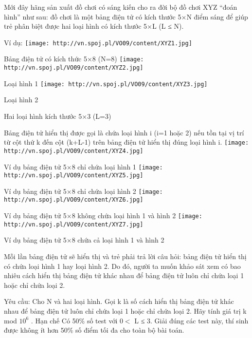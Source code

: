 Mới đây hãng sản xuất đồ chơi có sáng kiến cho ra đời bộ đồ chơi XYZ “đoán hình” như sau: đồ chơi là một bảng điện tử có kích thước 5×N điểm sáng để giúp trẻ phân biệt được hai loại hình có kích thước 5×L (L ≤ N).  

   Ví dụ:  
\texttt{[image: http://vn.spoj.pl/VO09/content/XYZ1.jpg]}

               Bảng điện tử có kích thức 5×8 (N=8)             
\texttt{[image: http://vn.spoj.pl/VO09/content/XYZ2.jpg]}

                       Loại hình 1                     
\texttt{[image: http://vn.spoj.pl/VO09/content/XYZ3.jpg]}

                       Loại hình 2                     

                       Hai loại hình kích thước 5×3 (L=3)                     

   Bảng điện tử hiển thị được gọi là chứa loại hình i (i=1 hoặc 2) nếu tồn tại vị trí từ cột thứ k đến cột (k+L-1) trên bảng điện tử hiển thị đúng loại hình i.  
\texttt{[image: http://vn.spoj.pl/VO09/content/XYZ4.jpg]}

               Ví dụ bảng điện tử 5×8 chỉ chứa loại hình 1             
\texttt{[image: http://vn.spoj.pl/VO09/content/XYZ5.jpg]}

               Ví dụ bảng điện tử 5×8 chỉ chứa loại hình 2             
\texttt{[image: http://vn.spoj.pl/VO09/content/XYZ6.jpg]}

               Ví dụ bảng điện tử 5×8  không chứa loại hình 1 và hình 2             
\texttt{[image: http://vn.spoj.pl/VO09/content/XYZ7.jpg]}

               Ví dụ bảng điện tử 5×8  chứa cả loại hình 1 và hình 2             

   Mỗi lần bảng điện tử sẽ hiển thị và trẻ phải trả lời câu hỏi: bảng điện tử hiển thị có chứa loại hình 1 hay loại hình 2. Do đó, người ta muốn khảo sát xem có bao nhiêu cách hiển thị bảng điện tử khác nhau để bảng điện tử luôn chỉ chứa loại 1 hoặc chỉ chứa loại 2.  

   Yêu cầu: Cho N và hai loại hình. Gọi k là số cách hiển thị bảng điện tử khác nhau để bảng điện tử luôn chỉ chứa loại 1 hoặc chỉ chứa loại 2. Hãy tính giá trị k  mod $10^{6}$   .
Hạn chế
Có 50\% số test với 0$<$ L ≤ 3. Giải đúng các test này, thí sinh được không ít hơn 50\% số điểm tối đa cho toàn bộ bài toán.
